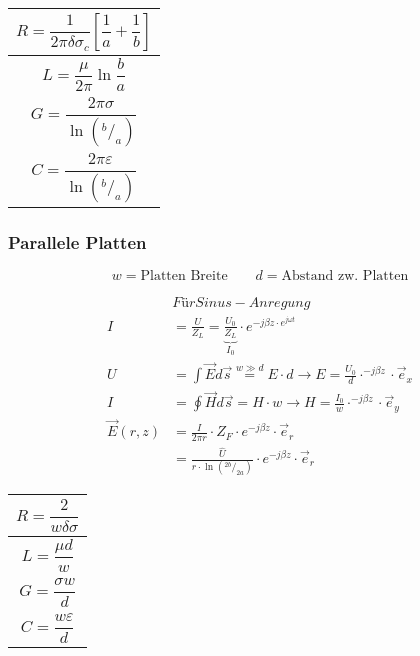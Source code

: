 
{\renewcommand*{\arraystretch}{0.2}
    \begin{tabularx}{0.5\columnwidth}{|X|}
        \hline
        \[R=\frac{1}{2\pi\delta\sigma_c}\left[\frac{1}{a}+\frac{1}{b}\right]\] \\
        \hline
        \[L=\frac{\mu}{2\pi}\ln\frac{b}{a}\]                                   \\
        \hline
        \[G=\frac{2\pi\sigma}{\ln(^b/_a)}\]                                    \\
        \hline
        \[C=\frac{2\pi\varepsilon}{\ln(^b/_a)}\]                               \\
        \hline
    \end{tabularx}}
    \linebreak
    \linebreak
    \linebreak
    \linebreak
    \linebreak
\subsubsection{Parallele Platten}
{\small\[
        w  = \text{Platten Breite} \qquad d  = \text{Abstand zw. Platten}
    \]}

\begin{align*}
                  & Für Sinus-Anregung                                                                                                 \\
    I             & = \frac{U}{Z_L} = \underbrace{\frac{U_0}{Z_L}}_{I_0}\cdot e^{-j\beta z\cdot e^{j\omega t}}                         \\
    U             & = \int \vec{E} d\vec{s} \stackrel{w\gg d}{=} E\cdot d \rightarrow E = \frac{U_0}{d}\cdot^{-j\beta z}\cdot\vec{e}_x \\
    I             & = \oint \vec{H} d\vec{s} =  H\cdot w \rightarrow H = \frac{I_0}{w}\cdot^{-j\beta z}\cdot\vec{e}_y                  \\
    \vec{E}(r, z) & = \frac{I}{2\pi r}\cdot Z_F\cdot e^{-j\beta z} \cdot\vec{e}_r                                                      \\
                  & = \frac{\hat{U}}{r \cdot\ln{(^{2b}/_{2a})}}\cdot e^{-j\beta z}\cdot\vec{e}_r
\end{align*}


{\renewcommand*{\arraystretch}{0.2}
    \begin{tabularx}{0.5\columnwidth}{|X|}
        \hline
        \[R=\frac{2}{w\delta\sigma}\] \\
        \hline
        \[L=\frac{\mu d}{w}\]         \\
        \hline
        \[G=\frac{\sigma w}{d}\]      \\
        \hline
        \[C=\frac{w\varepsilon}{d}\]  \\
        \hline
    \end{tabularx}
}

